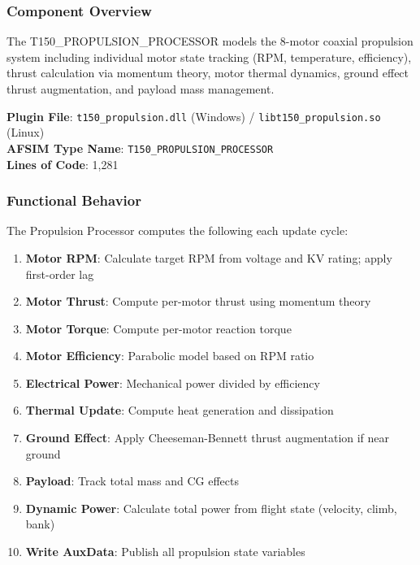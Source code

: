 \subsubsection{\unclass Component Overview}\label{sec:PropulsionOverview}

\unclass The T150\_PROPULSION\_PROCESSOR models the 8-motor coaxial propulsion system including individual motor state tracking (RPM, temperature, efficiency), thrust calculation via momentum theory, motor thermal dynamics, ground effect thrust augmentation, and payload mass management.

\unclass \textbf{Plugin File}: \texttt{t150\_propulsion.dll} (Windows) / \texttt{libt150\_propulsion.so} (Linux)\\
\textbf{AFSIM Type Name}: \texttt{T150\_PROPULSION\_PROCESSOR}\\
\textbf{Lines of Code}: 1,281

\subsubsection{\unclass Functional Behavior}\label{sec:PropulsionFunctionalBehavior}

\unclass The Propulsion Processor computes the following each update cycle:

\begin{enumerate}
	\item \unclass \textbf{Motor RPM}: Calculate target RPM from voltage and KV rating; apply first-order lag
	\item \unclass \textbf{Motor Thrust}: Compute per-motor thrust using momentum theory
	\item \unclass \textbf{Motor Torque}: Compute per-motor reaction torque
	\item \unclass \textbf{Motor Efficiency}: Parabolic model based on RPM ratio
	\item \unclass \textbf{Electrical Power}: Mechanical power divided by efficiency
	\item \unclass \textbf{Thermal Update}: Compute heat generation and dissipation
	\item \unclass \textbf{Ground Effect}: Apply Cheeseman-Bennett thrust augmentation if near ground
	\item \unclass \textbf{Payload}: Track total mass and CG effects
	\item \unclass \textbf{Dynamic Power}: Calculate total power from flight state (velocity, climb, bank)
	\item \unclass \textbf{Write AuxData}: Publish all propulsion state variables
\end{enumerate}

